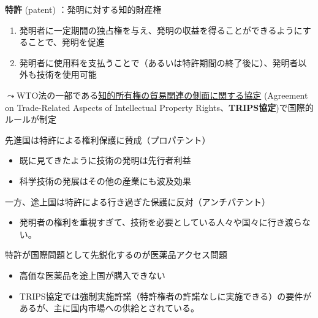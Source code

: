 \documentclass[
  xelatex,
  ja=standard]{bxjsarticle}
\providecommand{\tightlist}{%
  \setlength{\itemsep}{0pt}\setlength{\parskip}{0pt}}\usepackage{longtable,booktabs,array}
\begin{document}
\textbf{特許} (patent) ：発明に対する知的財産権

\begin{enumerate}
\def\labelenumi{\arabic{enumi}.}
\tightlist
\item
  発明者に一定期間の独占権を与え、発明の収益を得ることができるようにすることで、発明を促進
\item
  発明者に使用料を支払うことで（あるいは特許期間の終了後に）、発明者以外も技術を使用可能
\end{enumerate}

\(\leadsto\)WTO法の一部である\href{https://www.jpo.go.jp/system/laws/gaikoku/trips/index.html}{知的所有権の貿易関連の側面に関する協定}
(Agreement on Trade-Related Aspects of Intellectual Property
Rights、\textbf{TRIPS協定})で国際的ルールが制定

先進国は特許による権利保護に賛成（プロパテント）

\begin{itemize}
\tightlist
\item
  既に見てきたように技術の発明は先行者利益
\item
  科学技術の発展はその他の産業にも波及効果
\end{itemize}

一方、途上国は特許による行き過ぎた保護に反対（アンチパテント）

\begin{itemize}
\tightlist
\item
  発明者の権利を重視すぎて、技術を必要としている人々や国々に行き渡らない。
\end{itemize}

特許が国際問題として先鋭化するのが医薬品アクセス問題

\begin{itemize}
\tightlist
\item
  高価な医薬品を途上国が購入できない
\item
  TRIPS協定では強制実施許諾（特許権者の許諾なしに実施できる）の要件があるが、主に国内市場への供給とされている。
\end{itemize}
\end{document}
